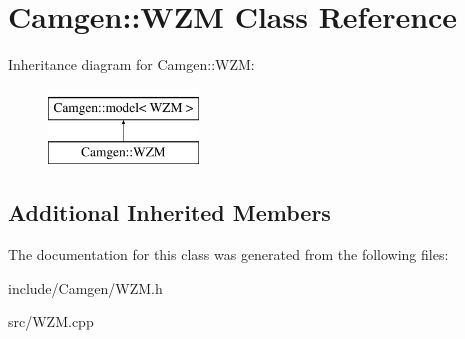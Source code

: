\hypertarget{a00599}{}\section{Camgen\+:\+:W\+Z\+M Class Reference}
\label{a00599}
Inheritance diagram for Camgen\+:\+:W\+Z\+M\+:\begin{figure}[H]
\begin{center}
\leavevmode
\includegraphics[height=2.000000cm]{a00599}
\end{center}
\end{figure}
\subsection*{Additional Inherited Members}


The documentation for this class was generated from the following files\+:\begin{DoxyCompactItemize}
\item 
include/\+Camgen/W\+Z\+M.\+h\item 
src/W\+Z\+M.\+cpp\end{DoxyCompactItemize}
